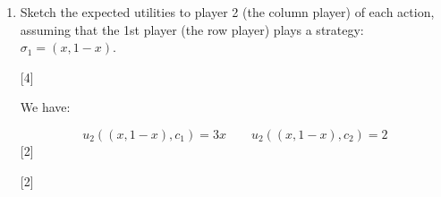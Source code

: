\documentclass[12pt,a4paper,twoside]{article}
\begin{document}
\begin{enumerate}
\begin{enumerate}
\begin{enumerate}
\begin{solution}
                        \hfill{[2]}

                        \begin{center}
%
%
%
                        \hfill{[2]}
                        \end{center}

                    \end{solution}


            \item Sketch the expected utilities to player 2 (the column player)
                of each action, assuming that the 1st player (the row player) plays a strategy: 
                 $\sigma_1 = (x,1-x)$.

            \hfill{[4]}

                    \begin{solution}
                        We have:

                        \[
                            u_2((x, 1 - x), c_1) = 3x
                            \qquad
                            u_2((x, 1 - x), c_2) = 2
                        \]
                        \hfill{[2]}

                        \begin{center}
%
%
%
                        \hfill{[2]}
                        \end{center}


\end{solution}
\end{enumerate}
\end{enumerate}
\end{enumerate}
\end{document}
